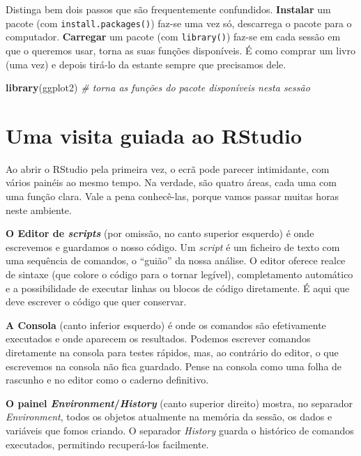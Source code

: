\documentclass[
  portuguese,
  11pt,
  openany]{book}
\newenvironment{Shaded}{\begin{snugshade}}{\end{snugshade}}
\newcommand{\CommentTok}[1]{\textcolor[rgb]{0.56,0.35,0.01}{\textit{#1}}}
\newcommand{\FunctionTok}[1]{\textcolor[rgb]{0.13,0.29,0.53}{\textbf{#1}}}
\newcommand{\NormalTok}[1]{#1}
\begin{document}
Distinga bem dois passos que são frequentemente confundidos. \textbf{Instalar} um
pacote (com \texttt{install.packages()}) faz-se uma vez só, descarrega o pacote para o
computador. \textbf{Carregar} um pacote (com \texttt{library()}) faz-se em cada sessão em que
o queremos usar, torna as suas funções disponíveis. É como comprar um livro
(uma vez) e depois tirá-lo da estante sempre que precisamos dele.

\begin{Shaded}
\begin{Highlighting}[]
\FunctionTok{library}\NormalTok{(ggplot2)   }\CommentTok{\# torna as funções do pacote disponíveis nesta sessão}
\end{Highlighting}
\end{Shaded}

\section{Uma visita guiada ao RStudio}\label{uma-visita-guiada-ao-rstudio}

Ao abrir o RStudio pela primeira vez, o ecrã pode parecer intimidante, com
vários painéis ao mesmo tempo. Na verdade, são quatro áreas, cada uma com uma
função clara. Vale a pena conhecê-las, porque vamos passar muitas horas neste
ambiente.

\textbf{O Editor de \emph{scripts}} (por omissão, no canto superior esquerdo) é onde
escrevemos e guardamos o nosso código. Um \emph{script} é um ficheiro de texto com uma
sequência de comandos, o ``guião'' da nossa análise. O editor oferece realce de
sintaxe (que colore o código para o tornar legível), completamento automático e a
possibilidade de executar linhas ou blocos de código diretamente. É aqui que
deve escrever o código que quer conservar.

\textbf{A Consola} (canto inferior esquerdo) é onde os comandos são efetivamente
executados e onde aparecem os resultados. Podemos escrever comandos diretamente
na consola para testes rápidos, mas, ao contrário do editor, o que escrevemos na
consola não fica guardado. Pense na consola como uma folha de rascunho e no
editor como o caderno definitivo.

\textbf{O painel \emph{Environment}/\emph{History}} (canto superior direito) mostra, no
separador \emph{Environment}, todos os objetos atualmente na memória da sessão, os
dados e variáveis que fomos criando. O separador \emph{History} guarda o histórico de
comandos executados, permitindo recuperá-los facilmente.
\end{document}
